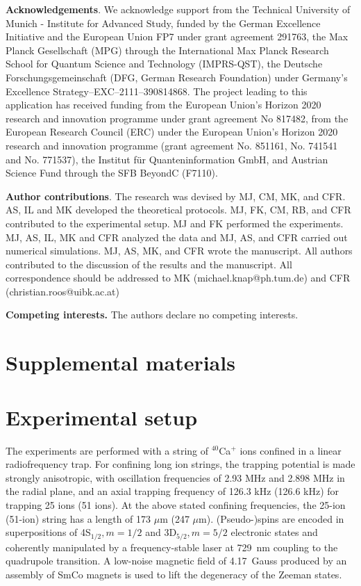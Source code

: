 \documentclass[aps,10pt,reprint,groupedaddress,superscriptaddress]{revtex4-2}
\begin{document}
\textbf{Acknowledgements}. %
We acknowledge support from the Technical University of Munich - Institute for Advanced Study, funded by the German Excellence Initiative and the European Union FP7 under grant agreement 291763, the Max Planck Gesellschaft (MPG) through the International Max Planck Research School for Quantum Science and Technology (IMPRS-QST), the Deutsche Forschungsgemeinschaft (DFG, German Research Foundation) under Germany’s Excellence Strategy--EXC--2111--390814868. The project leading to this application has received funding from the European Union’s Horizon 2020
research and innovation programme under grant agreement No 817482, from the European Research Council (ERC) under the European Union’s Horizon 2020 research and innovation programme (grant agreement No. 851161, No. 741541 and No. 771537), the Institut f\"ur Quanteninformation GmbH, and Austrian Science Fund through the SFB BeyondC (F7110).

\textbf{Author contributions}. The research was devised by MJ, CM, MK, and CFR. AS, IL and MK developed the theoretical protocols. MJ, FK, CM, RB, and CFR contributed to the experimental setup. MJ and FK performed the experiments. MJ, AS, IL, MK and CFR analyzed the data and MJ, AS, and CFR carried out numerical simulations. MJ, AS, MK, and CFR wrote the manuscript. All authors contributed to the discussion of the results and the manuscript. All correspondence should be addressed to MK (michael.knap@ph.tum.de) and CFR (christian.roos@uibk.ac.at)


\textbf{Competing interests.} The authors declare no competing interests.
 \newpage \ \newpage
\section*{\large \textbf{Supplemental materials}}

\section{Experimental setup}
The experiments are performed with a string of $^{40}$Ca$^+$ ions confined in a linear radiofrequency trap. For confining long ion strings, the trapping potential is made strongly anisotropic, with oscillation frequencies of 2.93 MHz and 2.898 MHz in the radial plane, and an axial trapping frequency of 126.3 kHz (126.6 kHz) for trapping 25 ions (51 ions). At the above stated confining frequencies, the 25-ion (51-ion) string has a length of 173 $\mu $m (247 $\mu$m). (Pseudo-)spins are encoded in superpositions of 4S$_{1/2},m=1/2$ and 3D$_{5/2},m=5/2$ electronic states and coherently manipulated by a frequency-stable laser at 729~nm coupling to the quadrupole transition. A low-noise magnetic field of 4.17~Gauss produced by an assembly of SmCo magnets is used to lift the degeneracy of the Zeeman states. 
\end{document}

